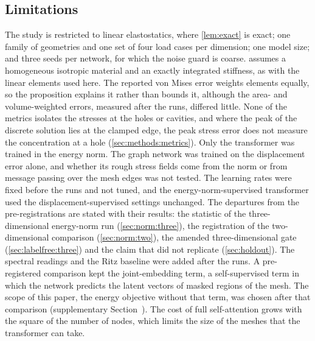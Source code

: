 \subsection{Limitations}
The study is restricted to linear elastostatics, where \cref{lem:exact} is exact; one family
of geometries and one set of four load cases per dimension; one model size; and three seeds
per network, for which the noise guard is coarse.  assumes a homogeneous
isotropic material and an exactly integrated stiffness, as with the linear elements used here. The reported von Mises error weights elements equally, so the proposition
explains it rather than bounds it, although the area- and volume-weighted errors, measured
after the runs, differed little. None of the metrics isolates the stresses at the holes or cavities,
and where the peak of the discrete solution lies at the clamped edge, the peak stress
error does not measure the concentration at a hole (\cref{sec:methods:metrics}). Only the transformer was trained in the energy norm. The graph network was trained on the displacement error alone, and whether its rough stress
fields come from the norm or from message passing over the mesh edges was not tested. The
learning rates were fixed before the runs and not tuned, and the energy-norm-supervised
transformer used the displacement-supervised settings unchanged. The departures from the
pre-registrations are stated with their results: the statistic of the three-dimensional
energy-norm run (\cref{sec:norm:three}), the registration of the two-dimensional comparison
(\cref{sec:norm:two}), the amended three-dimensional gate (\cref{sec:labelfree:three}) and the claim that did not replicate (\cref{sec:holdout}). The spectral readings and the Ritz
baseline were added after the runs. A pre-registered comparison kept the joint-embedding term, a self-supervised term in which
the network predicts the latent vectors of masked regions of the mesh. The scope of this paper, the energy
objective without that term, was chosen after that comparison (supplementary
Section~\SuppPrereg{}). The cost of full self-attention grows with the square of
the number of nodes, which limits the size of the meshes that the transformer can take.

